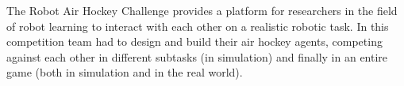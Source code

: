 The Robot Air Hockey Challenge provides a platform for researchers in the field of robot learning to interact with each
other on a realistic robotic task. In this competition team had to design and build their air hockey agents, competing against
each other in different subtasks (in simulation) and finally in an entire game (both in simulation and in the real world).



